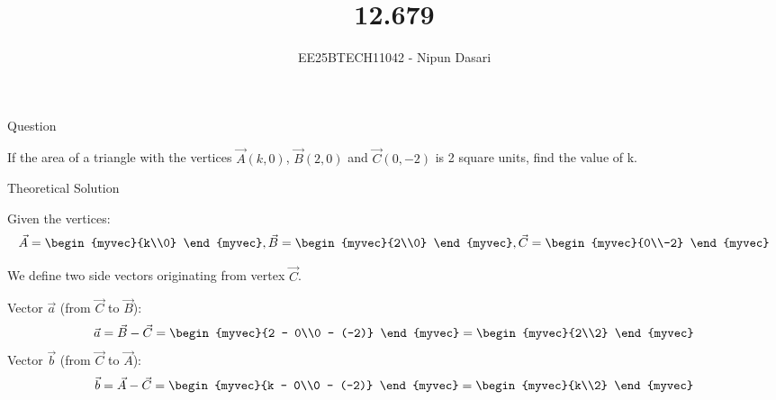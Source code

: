 \documentclass{beamer}
\title{12.679}
\author{EE25BTECH11042 - Nipun Dasari}
\numberwithin{equation}{section}
\providecommand{\brak}[1]{\ensuremath{\left(#1\right)}}
\theoremstyle{remark}
\begin{document}
	
	\begin{frame}
		\titlepage
	\end{frame}
	
	\begin{frame}{Question}
		
		If the area of a triangle with the vertices $\vec{A}\brak{k, 0}$, $\vec{B}\brak{2, 0}$ and $\vec{C}\brak{0, -2}$ is 2 square units, find the value of k.
		
	\end{frame}
	
	\begin{frame}{Theoretical Solution}
		
		Given the vertices:
		\begin{align}
			\vec{A} = \begin{myvec}{k\\0} \end{myvec} , \vec{B} = \begin{myvec}{2\\0} \end{myvec}, \vec{C} = \begin{myvec}{0\\-2} \end{myvec}
		\end{align}
		
		We define two side vectors originating from vertex $\vec{C}$.
		
		Vector $\vec{a}$ (from $\vec{C}$ to $\vec{B}$):
		\begin{align}
			\vec{a} = \vec{B}-\vec{C} = \begin{myvec}{2 - 0\\0 - (-2)} \end{myvec} = \begin{myvec}{2\\2} \end{myvec}
		\end{align}
		Vector $\vec{b}$ (from $\vec{C}$ to $\vec{A}$):
		\begin{align}
			\vec{b} = \vec{A}-\vec{C} = \begin{myvec}{k - 0\\0 - (-2)} \end{myvec} = \begin{myvec}{k\\2} \end{myvec}
		\end{align}
		
	\end{frame}
	
\end{document}

